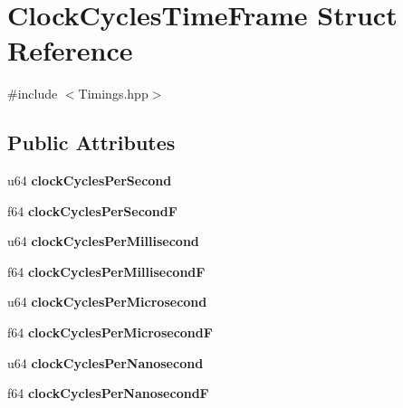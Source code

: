 \hypertarget{struct_clock_cycles_time_frame}{}\section{Clock\+Cycles\+Time\+Frame Struct Reference}
\label{struct_clock_cycles_time_frame}


{\ttfamily \#include $<$Timings.\+hpp$>$}

\subsection*{Public Attributes}
\begin{DoxyCompactItemize}
\item 
\mbox{\label{struct_clock_cycles_time_frame_abbb534e60d573edb6943b32986455643}} 
u64 {\bfseries clock\+Cycles\+Per\+Second}
\item 
\mbox{\label{struct_clock_cycles_time_frame_a7957fdb343c87628f496c961eae27a52}} 
f64 {\bfseries clock\+Cycles\+Per\+SecondF}
\item 
\mbox{\label{struct_clock_cycles_time_frame_a77a65b54cad1637171d94b744bdd1927}} 
u64 {\bfseries clock\+Cycles\+Per\+Millisecond}
\item 
\mbox{\label{struct_clock_cycles_time_frame_a79b45fc094f1ee5c99f65e9ba4c1fe45}} 
f64 {\bfseries clock\+Cycles\+Per\+MillisecondF}
\item 
\mbox{\label{struct_clock_cycles_time_frame_aeaff39f2c9727759b40878d95163118c}} 
u64 {\bfseries clock\+Cycles\+Per\+Microsecond}
\item 
\mbox{\label{struct_clock_cycles_time_frame_ad0a7c1ee8fb2b7d88459a90f31575dca}} 
f64 {\bfseries clock\+Cycles\+Per\+MicrosecondF}
\item 
\mbox{\label{struct_clock_cycles_time_frame_a8b4a33fc5be2043f5614dd46535685d1}} 
u64 {\bfseries clock\+Cycles\+Per\+Nanosecond}
\item 
\mbox{\label{struct_clock_cycles_time_frame_a642022b52fdcb8969c73e9d3a29487bf}} 
f64 {\bfseries clock\+Cycles\+Per\+NanosecondF}
\end{DoxyCompactItemize}


